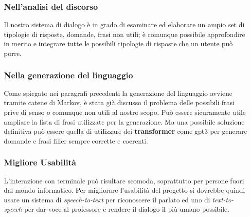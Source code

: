 \subsubsection{Nell'analisi del discorso}
Il nostro sistema di dialogo è in grado di esaminare ed elaborare un ampio set di tipologie di risposte, domande, frasi non utili; è comunque possibile approfondire in merito e integrare tutte le possibili tipologie di risposte che un utente può porre.
\subsubsection{Nella generazione del linguaggio}
Come spiegato nei paragrafi precedenti la generazione del linguaggio avviene tramite catene di Markov, è stata già discusso il problema delle possibili frasi prive di senso o comunque non utili al nostro scopo. Può essere sicuramente utile ampliare la lista di frasi utilizzate per la generazione. Ma una possibile soluzione definitiva può essere quella di utilizzare dei \textbf{transformer} come gpt3 per generare domande e frasi filler sempre corrette e coerenti.

\subsubsection{Migliore Usabilità}
L'interazione con terminale può risultare scomoda, soprattutto per persone fuori dal mondo informatico. Per migliorare l'usabilità del progetto si dovrebbe quindi usare un sistema di \textit{speech-to-text} per riconoscere il parlato ed uno di \textit{text-to-speech} per dar voce al professore e rendere il dialogo il più umano possibile.